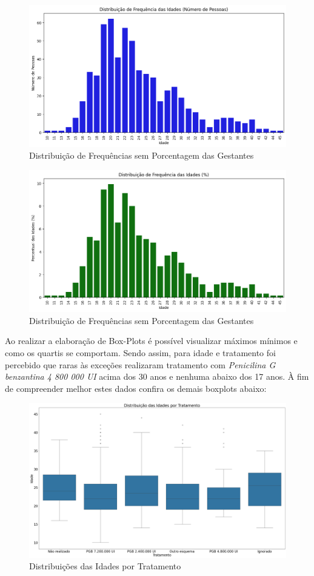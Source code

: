 \documentclass[a4paper]{article}
\begin{document}
\begin{multicols}
\begin{figure}[h!]
    \centering
\includegraphics[width=0.7\linewidth]{imagens/FreqNums.png}
    \caption{Distribuição de Frequências sem Porcentagem das Gestantes}
    \label{fig:enter-label}
\end{figure}
\begin{figure}[h!]
    \centering
    \includegraphics[width=0.7\linewidth]{imagens/FreqPercents.png}
    \caption{Distribuição de Frequências sem Porcentagem das Gestantes}
    \label{fig:enter-label}
\end{figure}

Ao realizar a elaboração de Box-Plots é possível visualizar máximos mínimos e como os quartis se comportam. Sendo assim, para idade e tratamento foi percebido que raras às exceções realizaram tratamento com \textit{Penicilina G benzantina 4 800 000 UI} acima dos 30 anos e nenhuma abaixo dos 17 anos. À fim de compreender melhor estes dados confira os demais boxplots abaixo:
\begin{figure}[h!]
    \centering
    \includegraphics[width=1\linewidth]{imagens/tratamento_idade_boxplot.png}
    \caption{Distribuições das Idades por Tratamento}
    \label{fig:enter-label}
\end{figure}


\end{multicols}
\end{document}
